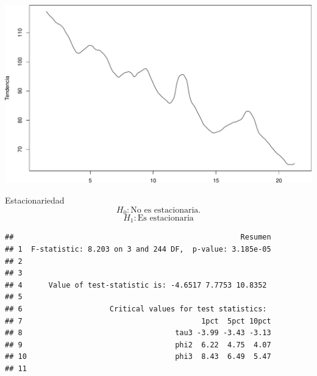 \documentclass[
  10pt,
  ignorenonframetext,
  aspectratio=1612]{beamer}
\newenvironment{Shaded}{\begin{snugshade}}{\end{snugshade}}
\newcommand{\AttributeTok}[1]{\textcolor[rgb]{0.13,0.29,0.53}{#1}}
\newcommand{\FunctionTok}[1]{\textcolor[rgb]{0.13,0.29,0.53}{\textbf{#1}}}
\newcommand{\NormalTok}[1]{#1}
\newcommand{\SpecialCharTok}[1]{\textcolor[rgb]{0.81,0.36,0.00}{\textbf{#1}}}
\newcommand{\StringTok}[1]{\textcolor[rgb]{0.31,0.60,0.02}{#1}}
\begin{document}
\begin{frame}[fragile]{}
\label{section-5}
\begin{Shaded}
\end{Shaded}

\includegraphics{Informe_files/figure-beamer/unnamed-chunk-15-1.pdf}
\end{frame}

\begin{frame}[fragile]{Estacionariedad}
\label{estacionariedad}
\[H_0: \text{No es estacionaria.}\] \[H_1: \text{Es estacionaria}\]

\begin{verbatim}
##                                                    Resumen
## 1  F-statistic: 8.203 on 3 and 244 DF,  p-value: 3.185e-05
## 2                                                         
## 3                                                         
## 4      Value of test-statistic is: -4.6517 7.7753 10.8352 
## 5                                                         
## 6                    Critical values for test statistics: 
## 7                                         1pct  5pct 10pct
## 8                                   tau3 -3.99 -3.43 -3.13
## 9                                   phi2  6.22  4.75  4.07
## 10                                  phi3  8.43  6.49  5.47
## 11
\end{verbatim}
\end{frame}
\end{document}
